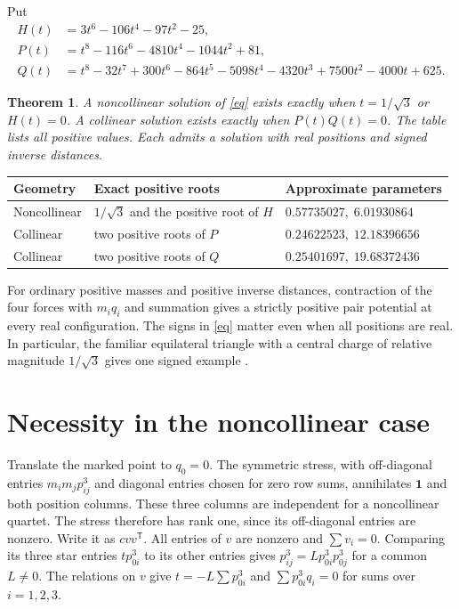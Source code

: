 \documentclass[11pt]{article}
\newtheorem{theorem}{Theorem}
\begin{document}
Put
\begin{align*}
 H(t)&=3t^6-106t^4-97t^2-25,\\
 P(t)&=t^8-116t^6-4810t^4-1044t^2+81,\\
 Q(t)&=t^8-32t^7+300t^6-864t^5-5098t^4-4320t^3+7500t^2-4000t+625.
\end{align*}
\begin{theorem}\label{mass}
A noncollinear solution of \eqref{eq} exists exactly when $t=1/\sqrt3$ or $H(t)=0$. A collinear solution exists exactly when $P(t)Q(t)=0$. The table lists all positive values. Each admits a solution with real positions and signed inverse distances.
\end{theorem}
\begin{center}\small
\begin{tabular}{lll}
\toprule Geometry & Exact positive roots & Approximate parameters\\\midrule
Noncollinear & $1/\sqrt3$ and the positive root of $H$ & $0.57735027,\;6.01930864$\\
Collinear & two positive roots of $P$ & $0.24622523,\;12.18396656$\\
Collinear & two positive roots of $Q$ & $0.25401697,\;19.68372436$\\\bottomrule
\end{tabular}
\end{center}
For ordinary positive masses and positive inverse distances, contraction of the four forces with $m_iq_i$ and summation gives a strictly positive pair potential at every real configuration. The signs in \eqref{eq} matter even when all positions are real. In particular, the familiar equilateral triangle with a central charge of relative magnitude $1/\sqrt3$ gives one signed example \cite{UF}.

\section{Necessity in the noncollinear case}
Translate the marked point to $q_0=0$. The symmetric stress, with off-diagonal entries $m_i m_j p_{ij}^3$ and diagonal entries chosen for zero row sums, annihilates $\mathbf1$ and both position columns. These three columns are independent for a noncollinear quartet. The stress therefore has rank one, since its off-diagonal entries are nonzero. Write it as $c vv^{\mathsf T}$. All entries of $v$ are nonzero and $\sum v_i=0$. Comparing its three star entries $t p_{0i}^3$ to its other entries gives $p_{ij}^3=L p_{0i}^3p_{0j}^3$ for a common $L\ne0$. The relations on $v$ give $t=-L\sum p_{0i}^3$ and $\sum p_{0i}^3q_i=0$ for sums over $i=1,2,3$.
\end{document}
